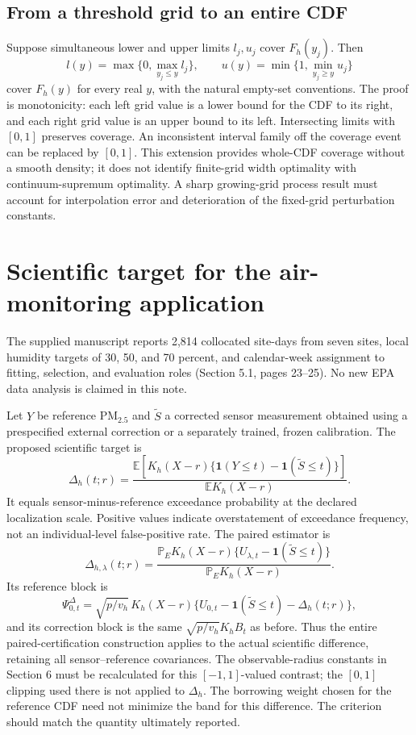 \documentclass[11pt]{article}
\theoremstyle{remark}\newtheorem{remark}[theorem]{Remark}
\newcommand{\E}{\mathbb E}
\newcommand{\ind}{\mathbf 1}
\begin{document}
\subsection{From a threshold grid to an entire CDF}
Suppose simultaneous lower and upper limits $l_j,u_j$ cover $F_h(y_j)$. Then
\[
 l(y)=\max\{0,\max_{y_j\leq y}l_j\},\qquad
 u(y)=\min\{1,\min_{y_j\geq y}u_j\}
\]
cover $F_h(y)$ for every real $y$, with the natural empty-set conventions. The proof is monotonicity: each left grid value is a lower bound for the CDF to its right, and each right grid value is an upper bound to its left. Intersecting limits with $[0,1]$ preserves coverage. An inconsistent interval family off the coverage event can be replaced by $[0,1]$.
This extension provides whole-CDF coverage without a smooth density; it does not identify finite-grid width optimality with continuum-supremum optimality. A sharp growing-grid process result must account for interpolation error and deterioration of the fixed-grid perturbation constants.

\section{Scientific target for the air-monitoring application}
The supplied manuscript reports 2,814 collocated site-days from seven sites, local humidity targets of 30, 50, and 70 percent, and calendar-week assignment to fitting, selection, and evaluation roles (Section 5.1, pages 23--25).
No new EPA data analysis is claimed in this note.

Let $Y$ be reference PM$_{2.5}$ and $\widetilde S$ a corrected sensor measurement obtained using a prespecified external correction or a separately trained, frozen calibration. The proposed scientific target is
\[
 \Delta_h(t;r)=\frac{\E[K_h(X-r)\{\ind(Y\leq t)-\ind(\widetilde S\leq t)\}]}{\E K_h(X-r)}.
\]
It equals sensor-minus-reference exceedance probability at the declared localization scale. Positive values indicate overstatement of exceedance frequency, not an individual-level false-positive rate.
The paired estimator is
\[
 \widehat\Delta_{h,\lambda}(t;r)
 =\frac{\mathbb P_E K_h(X-r)\{U_{\lambda,t}-\ind(\widetilde S\leq t)\}}{\mathbb P_E K_h(X-r)}.
\]
Its reference block is
\[
 \Psi^{\Delta}_{0,t}
 =\sqrt{p/v_h}\,K_h(X-r)
 \{U_{0,t}-\ind(\widetilde S\leq t)-\Delta_h(t;r)\},
\]
and its correction block is the same $\sqrt{p/v_h}K_h B_t$ as before. Thus the entire paired-certification construction applies to the actual scientific difference, retaining all sensor--reference covariances.
The observable-radius constants in Section 6 must be recalculated for this $[-1,1]$-valued contrast; the $[0,1]$ clipping used there is not applied to $\Delta_h$. The borrowing weight chosen for the reference CDF need not minimize the band for this difference. The criterion should match the quantity ultimately reported.
\end{document}
